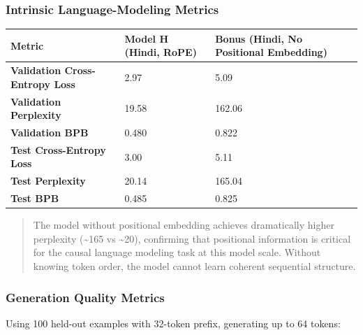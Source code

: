 \documentclass[10pt,a4paper]{article}
\begin{document}
\subsubsection{Intrinsic Language-Modeling Metrics}

\begin{center}
\small
\begin{longtable}{l l l}
\toprule
Metric & Model H (Hindi, RoPE) & Bonus (Hindi, No Positional Embedding) \\
\midrule
\endhead
\textbf{Validation Cross-Entropy Loss} & 2.97 & 5.09 \\
\textbf{Validation Perplexity} & 19.58 & 162.06 \\
\textbf{Validation BPB} & 0.480 & 0.822 \\
\textbf{Test Cross-Entropy Loss} & 3.00 & 5.11 \\
\textbf{Test Perplexity} & 20.14 & 165.04 \\
\textbf{Test BPB} & 0.485 & 0.825 \\
\bottomrule
\end{longtable}
\end{center}

\begin{quote}
The model without positional embedding achieves dramatically higher perplexity (\textasciitilde{}165 vs \textasciitilde{}20), confirming that positional information is critical for the causal language modeling task at this model scale. Without knowing token order, the model cannot learn coherent sequential structure.
\end{quote}

\subsubsection{Generation Quality Metrics}

Using 100 held-out examples with 32-token prefix, generating up to 64 tokens:
\end{document}
